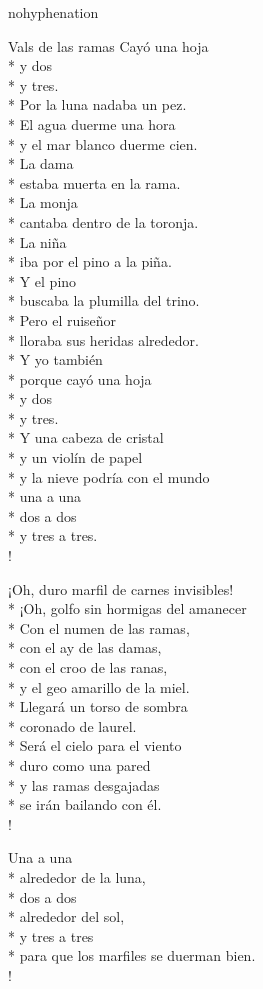 \documentclass[
    a5paper,
    DIV=10,
    12pt,
    notitlepage,
    oneside,]
{scrbook} %
\begin{document}
\begin{hyphenrules}{nohyphenation}
\begin{poem}{Vals de las ramas}{}{\vspace{-1em}}
Cayó una hoja\\*
y dos\\*
y tres.\\*
Por la luna nadaba un pez.\\*
El agua duerme una hora\\*
y el mar blanco duerme cien.\\*
La dama\\*
estaba muerta en la rama.\\*
La monja\\*
cantaba dentro de la toronja.\\*
La niña\\*
iba por el pino a la piña.\\*
Y el pino\\*
buscaba la plumilla del trino.\\*
Pero el ruiseñor\\*
lloraba sus heridas alrededor.\\*
Y yo también\\*
porque cayó una hoja\\*
y dos\\*
y tres.\\*
Y una cabeza de cristal\\*
y un violín de papel\\*
y la nieve podría con el mundo\\*
una a una\\*
dos a dos\\*
y tres a tres.\\!

¡Oh, duro marfil de carnes invisibles!\\*
¡Oh, golfo sin hormigas del amanecer\\*
Con el numen de las ramas,\\*
con el ay de las damas,\\*
con el croo de las ranas,\\*
y el geo amarillo de la miel.\\*
Llegará un torso de sombra\\*
coronado de laurel.\\*
Será el cielo para el viento\\*
duro como una pared\\*
y las ramas desgajadas\\*
se irán bailando con él.\\!

Una a una\\*
alrededor de la luna,\\*
dos a dos\\*
alrededor del sol,\\*
y tres a tres\\*
para que los marfiles se duerman bien.\\!


\end{poem}
\end{hyphenrules}
\end{document}
